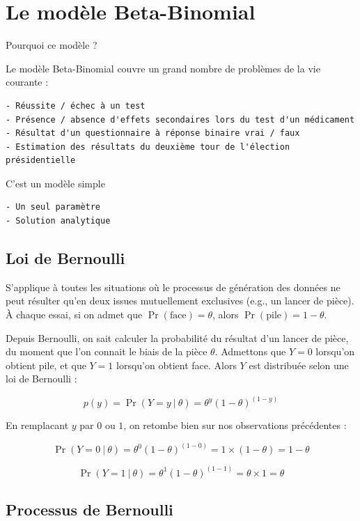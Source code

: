 \documentclass[
  a4paper,11pt,twoside,onecolumn,openright,final,oldfontcommands]{memoir}
\theoremstyle{definition}
\theoremstyle{definition}
\theoremstyle{definition}
\theoremstyle{definition}
\theoremstyle{remark}
\begin{document}
\hypertarget{le-moduxe8le-beta-binomial}{%
\section{Le modèle Beta-Binomial}\label{le-moduxe8le-beta-binomial}}

Pourquoi ce modèle ?

Le modèle Beta-Binomial couvre un grand nombre de problèmes de la vie courante :

\begin{verbatim}
- Réussite / échec à un test
- Présence / absence d'effets secondaires lors du test d'un médicament
- Résultat d'un questionnaire à réponse binaire vrai / faux 
- Estimation des résultats du deuxième tour de l'élection présidentielle 
\end{verbatim}

C'est un modèle simple

\begin{verbatim}
- Un seul paramètre
- Solution analytique
\end{verbatim}

\hypertarget{loi-de-bernoulli}{%
\subsection{Loi de Bernoulli}\label{loi-de-bernoulli}}

S'applique à toutes les situations où le processus de génération des données ne peut résulter qu'en deux issues mutuellement exclusives (e.g., un lancer de pièce). À chaque essai, si on admet que \(\Pr(\text{face}) = \theta\), alors \(\Pr(\text{pile}) = 1 - \theta\).

Depuis Bernoulli, on sait calculer la probabilité du résultat d'un lancer de pièce, du moment que l'on connait le biais de la pièce \(\theta\). Admettons que \(Y = 0\) lorsqu'on obtient pile, et que \(Y = 1\) lorsqu'on obtient face. Alors \(Y\) est distribuée selon une loi de Bernoulli :

\[p(y) = \Pr(Y = y \ | \ \theta) = \theta^{y} (1 - \theta)^{(1 - y)}\]

En remplacant \(y\) par \(0\) ou \(1\), on retombe bien sur nos observations précédentes :

\[\Pr(Y = 0 \ | \ \theta) = \theta^{0} (1 - \theta)^{(1 - 0)} = 1 \times (1 - \theta) = 1 - \theta\]

\[\Pr(Y = 1 \ | \ \theta) = \theta^{1} (1 - \theta)^{(1 - 1)} = \theta \times 1 = \theta\]

\hypertarget{processus-de-bernoulli}{%
\subsection{Processus de Bernoulli}\label{processus-de-bernoulli}}
\end{document}
